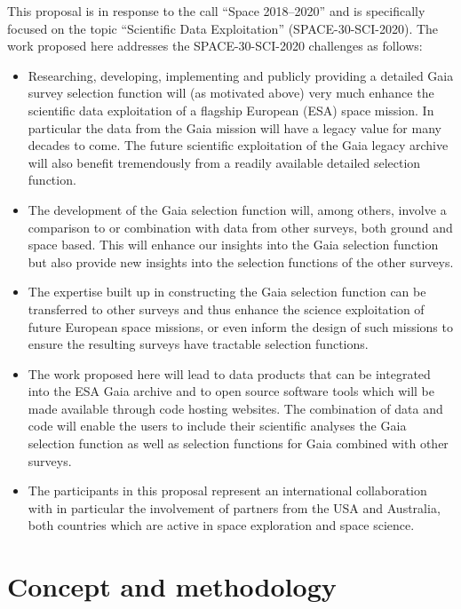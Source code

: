 This proposal is in response to the call ``Space 2018--2020'' and is specifically focused on the topic ``Scientific Data Exploitation'' (SPACE-30-SCI-2020). The work proposed here addresses the SPACE-30-SCI-2020 challenges as follows:
\begin{itemize}
    \item Researching, developing, implementing and publicly providing a detailed Gaia survey selection function will (as motivated above) very much enhance the scientific data exploitation of a flagship European (ESA) space mission. In particular the data from the Gaia mission will have a legacy value for many decades to come. The future scientific exploitation of the Gaia legacy archive will also benefit tremendously from a readily available detailed selection function.
    \item The development of the Gaia selection function will, among others, involve a comparison to or combination with data from other surveys, both ground and space based.  This will enhance our insights into the Gaia selection function but also provide new insights into the selection functions of the other surveys. 
    \item The expertise built up in constructing the Gaia selection function can be transferred to other surveys and thus enhance the science exploitation of future European space missions, or even inform the design of such missions to ensure the resulting surveys have tractable selection functions.
    \item The work proposed here will lead to data products that can be integrated into the ESA Gaia archive and to open source software tools which will be made available through code hosting websites. The combination of data and code will enable the users to include their scientific analyses the Gaia selection function as well as selection functions for Gaia combined with other surveys.
    \item The participants in this proposal represent an international collaboration with in particular the involvement of partners from the USA and Australia, both countries which are active in space exploration and space science.
\end{itemize}

\section{Concept and methodology}
\label{sec:conceptandmethods}
